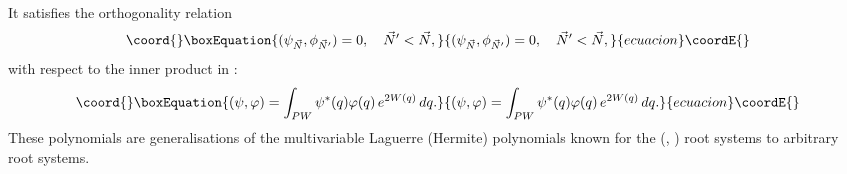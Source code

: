 \documentclass[a4paper,12pt]{article}
\begin{document}
It satisfies the orthogonality relation
\begin{equation}\coord{}\boxEquation{
(\psi_{\vec{N}},\phi_{\vec{N}^\prime})=0,\quad \vec{N}^\prime<\vec{N},
}{
(\psi_{\vec{N}},\phi_{\vec{N}^\prime})=0,\quad \vec{N}^\prime<\vec{N},
}{ecuacion}\coordE{}\end{equation}
with respect to the inner product in \coordHE{}:
\begin{equation}\coord{}\boxEquation{
(\psi,\varphi)=\int_{PW}\psi^*(q)\varphi(q)\,e^{2W(q)}\,dq.
}{
(\psi,\varphi)=\int_{PW}\psi^*(q)\varphi(q)\,e^{2W(q)}\,dq.
}{ecuacion}\coordE{}\end{equation}
These polynomials \coordHE{} are generalisations of the
multivariable Laguerre (Hermite) polynomials \cite{Lass} known for the
\coordHE{} (\coordHE{}, \coordHE{}) root systems to arbitrary root systems.
\end{document}

